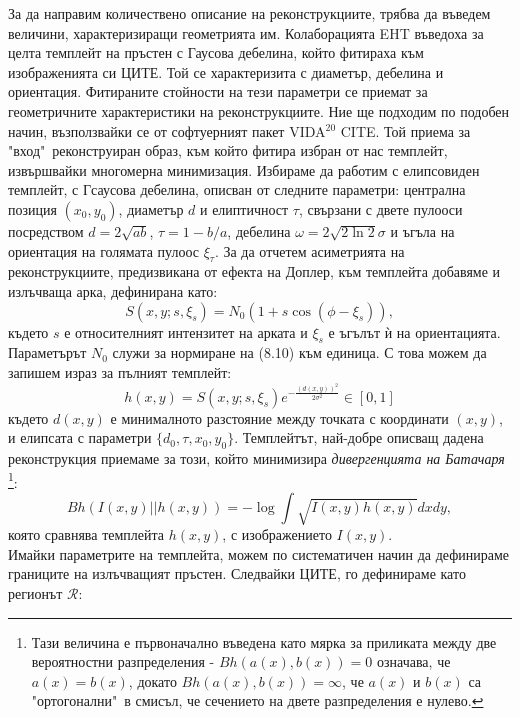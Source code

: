За да направим количествено описание на реконструкциите, трябва да въведем величини, характеризиращи геометрията им. Колаборацията EHT въведоха за целта темплейт на пръстен с Гаусова дебелина, който фитираха към изображенията си ЦИТЕ. Той се характеризита с диаметър, дебелина и ориентация. Фитираните стойности на тези параметри се приемат за геометричните характеристики на реконструкциите. Ние ще подходим по подобен начин, възползвайки се от софтуерният пакет VIDA$^{20}$ CITE. Той приема за "вход"$\,$ реконструиран образ, към който фитира избран от нас темплейт, извършвайки многомерна минимизация. Избираме да работим с елипсовиден темплейт, с Гсаусова дебелина, описван от следните параметри: централна позиция $(x_0,y_0)$, диаметър $d$ и елиптичност $\tau$, свързани с двете пулооси посредством $d = 2\sqrt{ab}$, $\tau = 1 - b/a$, дебелина $\mathcal{\omega} = 2\sqrt{2\ln2}\sigma$ и ъгъла на ориентация на голямата пулоос $\xi_\tau$. За да отчетем асиметрията на реконструкциите, предизвикана от ефекта на Доплер, към темплейта добавяме и излъчваща арка, дефинирана като:
\begin{equation}
	S(x,y;s,\xi_s) = N_0(1 + s\cos(\phi - \xi_s)),
\end{equation}
където $s$ е относителният интензитет на арката и $\xi_s$ е ъгълът ѝ на ориентацията. Параметърът $N_0$ служи за нормиране на (8.10) към единица. С това можем да запишем израз за пълният темплейт:
\begin{equation}
	h(x,y) = S(x,y;s,\xi_s)e^{-\frac{(d(x,y))^2}{2\sigma^2}}\in[0,1]
\end{equation}
където $d(x,y)$ е минималното разстояние между точката с координати $(x,y)$, и елипсата с параметри $\{d_0,\tau,x_0,y_0\}$. Темплейтът, най-добре описващ дадена реконструкция приемаме за този, който минимизира \emph{дивергенцията на Батачаря} \footnote{Тази величина е първоначално въведена като мярка за приликата между две вероятностни разпределения - $Bh(a(x),b(x)) = 0$ означава, че $a(x) = b(x)$, докато $Bh(a(x), b(x)) = \infty$, че $a(x)$ и $b(x)$ са "ортогонални"$\,$ в смисъл, че сечението на двете разпределения е нулево.}:
\begin{equation}
	Bh\left(I(x,y)||h(x,y)\right)= -\log\int\sqrt{I(x,y)h(x,y)}dxdy,
\end{equation}
която сравнява темплейта $h(x,y)$, с изображението $I(x,y)$.\\

Имайки параметрите на темплейта, можем по систематичен начин да дефинираме границите на излъчващият пръстен. Следвайки ЦИТЕ, го дефинираме като регионът $\mathcal{R}$:

